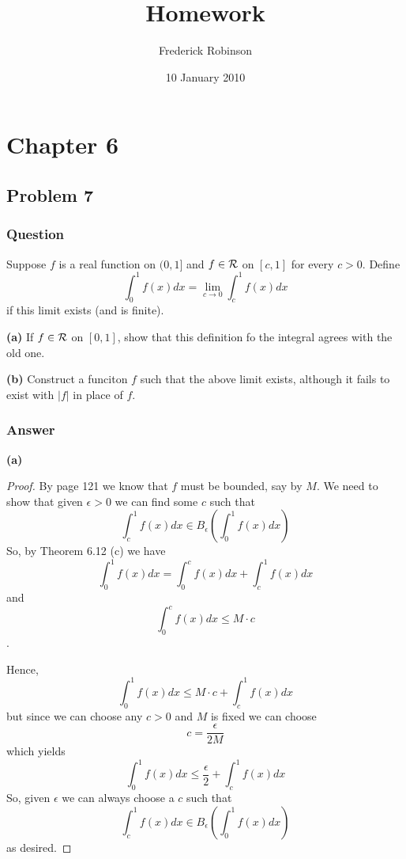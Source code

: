 \documentclass[12pt]{article}
\title{Homework}
\author{Frederick Robinson}
\date{10 January 2010}
\begin{document}

   \maketitle

\setcounter{tocdepth}{2} 


\section{Chapter 6}

\subsection{Problem 7}

\subsubsection{Question}
Suppose $f$ is a real function on $(0,1]$ and $f \in \cal{R}$ on $[c,1]$ for every $c>0$. Define
\[\int_0^1 f(x) dx = \lim_{c\to0}\int_c^1 f(x) dx\]
if this limit exists (and is finite).

\textbf{(a)} If $f\in\cal{R}$ on $[0,1]$, show that this definition fo the integral agrees with the old one.

\textbf{(b)} Construct a funciton $f$ such that the above limit exists, although it fails to exist with $|f|$ in place of $f$.

\subsubsection{Answer}
\textbf{(a)} \begin{proof}By page 121 we know that $f$ must be bounded, say by $M$. We need to show that given $\epsilon >0$ we can find some $c$ such that 
\[\int_c^1 f(x) dx \in B_\epsilon \left( \int_0^1 f(x) dx \right)\]
So, by Theorem 6.12 (c) we have 
\[\int_0^1 f(x) dx = \int_0^c f(x) dx + \int_c^1 f(x) dx\]
and
\[\int_0^c f(x) dx \leq M \cdot c\].

Hence, 
\[\int_0^1 f(x) dx \leq M \cdot c + \int_c^1 f(x) dx\]
but since we can choose any $c>0$ and $M$ is fixed we can choose 
\[c = \frac{\epsilon}{2M}\]
which yields
\[\int_0^1 f(x) dx \leq \frac{\epsilon}{2}+ \int_c^1 f(x) dx\]
So, given $\epsilon$ we can always choose a $c$ such that 
\[\int_c^1 f(x) dx \in B_\epsilon \left( \int_0^1 f(x) dx \right)\]
as desired.\end{proof}
\end{document}
